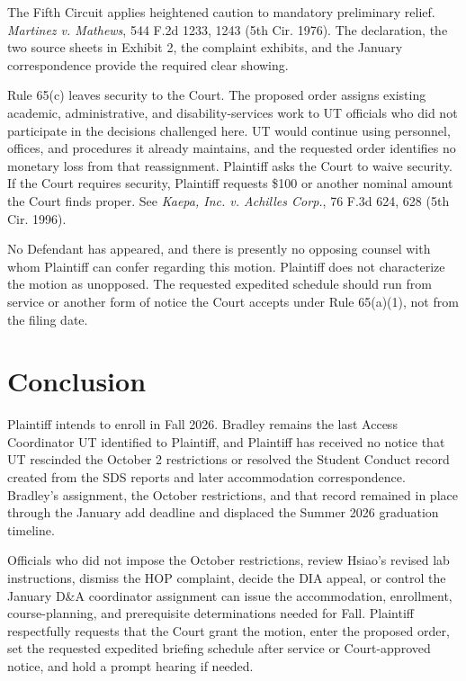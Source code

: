 \documentclass[12pt]{article}
\begin{document}
The Fifth Circuit applies heightened caution to mandatory preliminary relief. \textit{Martinez v. Mathews}, 544 F.2d 1233, 1243 (5th Cir. 1976). The declaration, the two source sheets in Exhibit 2, the complaint exhibits, and the January correspondence provide the required clear showing.
 
Rule 65(c) leaves security to the Court. The proposed order assigns existing academic, administrative, and disability-services work to UT officials who did not participate in the decisions challenged here. UT would continue using personnel, offices, and procedures it already maintains, and the requested order identifies no monetary loss from that reassignment. Plaintiff asks the Court to waive security. If the Court requires security, Plaintiff requests \$100 or another nominal amount the Court finds proper. See \textit{Kaepa, Inc. v. Achilles Corp.}, 76 F.3d 624, 628 (5th Cir. 1996).
 
No Defendant has appeared, and there is presently no opposing counsel with whom Plaintiff can confer regarding this motion. Plaintiff does not characterize the motion as unopposed. The requested expedited schedule should run from service or another form of notice the Court accepts under Rule 65(a)(1), not from the filing date.
 
\section*{Conclusion}
 
Plaintiff intends to enroll in Fall 2026. Bradley remains the last Access Coordinator UT identified to Plaintiff, and Plaintiff has received no notice that UT rescinded the October 2 restrictions or resolved the Student Conduct record created from the SDS reports and later accommodation correspondence. Bradley's assignment, the October restrictions, and that record remained in place through the January add deadline and displaced the Summer 2026 graduation timeline.
 
Officials who did not impose the October restrictions, review Hsiao's revised lab instructions, dismiss the HOP complaint, decide the DIA appeal, or control the January D\&A coordinator assignment can issue the accommodation, enrollment, course-planning, and prerequisite determinations needed for Fall. Plaintiff respectfully requests that the Court grant the motion, enter the proposed order, set the requested expedited briefing schedule after service or Court-approved notice, and hold a prompt hearing if needed.
 
\end{document}
